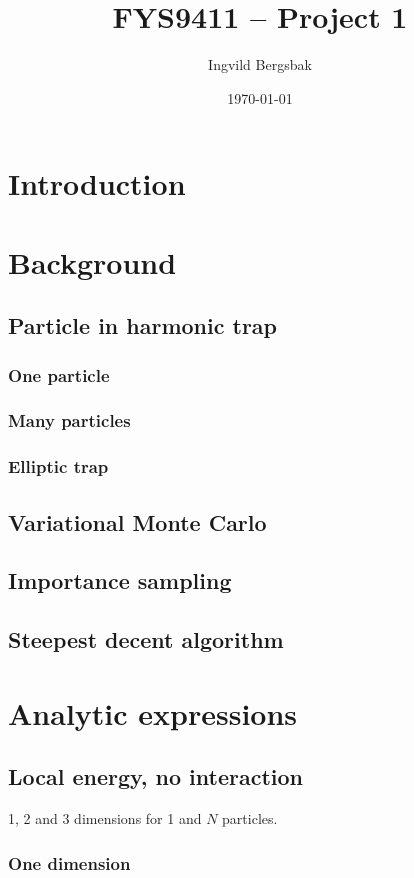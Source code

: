 \documentclass{article}
\title{FYS9411 -- Project 1}
\author{Ingvild Bergsbak}
\date{\today}
\begin{document}
\maketitle

\section{Introduction}

\section{Background}
\subsection{Particle in harmonic trap}
	\subsubsection{One particle}
	\subsubsection{Many particles}
	\subsubsection{Elliptic trap}
\subsection{Variational Monte Carlo}
\subsection{Importance sampling}
\subsection{Steepest decent algorithm}

\section{Analytic expressions}

\subsection{Local energy, no interaction}
1, 2 and 3 dimensions for 1 and $N$ particles.

\subsubsection{One dimension}
\end{document}
